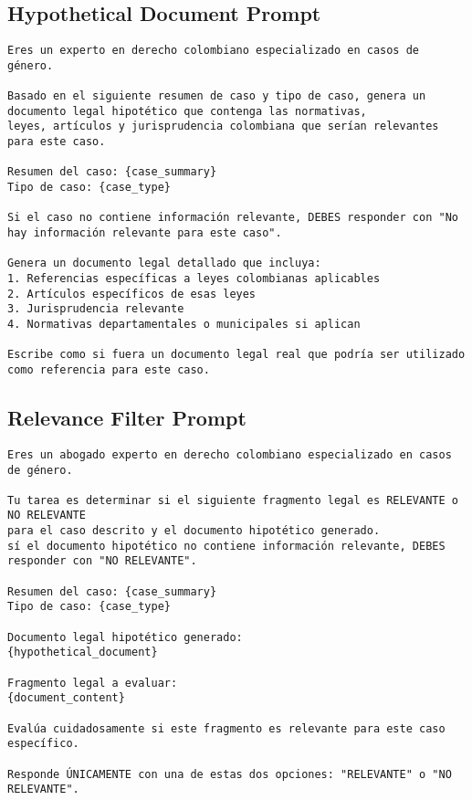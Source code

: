 \subsection{Hypothetical Document Prompt}
\label{subsec:hyde-prompt}
\begin{lstlisting}[style=prompt]
Eres un experto en derecho colombiano especializado en casos de género.
                        
Basado en el siguiente resumen de caso y tipo de caso, genera un documento legal hipotético que contenga las normativas, 
leyes, artículos y jurisprudencia colombiana que serían relevantes para este caso.
                        
Resumen del caso: {case_summary}
Tipo de caso: {case_type}

Si el caso no contiene información relevante, DEBES responder con "No hay información relevante para este caso".   

Genera un documento legal detallado que incluya:
1. Referencias específicas a leyes colombianas aplicables
2. Artículos específicos de esas leyes
3. Jurisprudencia relevante
4. Normativas departamentales o municipales si aplican
                        
Escribe como si fuera un documento legal real que podría ser utilizado como referencia para este caso.
\end{lstlisting}

\subsection{Relevance Filter Prompt}
\label{subsec:relevance-filter-prompt}
\begin{lstlisting}[style=prompt]
Eres un abogado experto en derecho colombiano especializado en casos de género.
                        
Tu tarea es determinar si el siguiente fragmento legal es RELEVANTE o NO RELEVANTE 
para el caso descrito y el documento hipotético generado.
sí el documento hipotético no contiene información relevante, DEBES responder con "NO RELEVANTE".
                        
Resumen del caso: {case_summary}
Tipo de caso: {case_type}
                        
Documento legal hipotético generado:
{hypothetical_document}
                        
Fragmento legal a evaluar:
{document_content}
                        
Evalúa cuidadosamente si este fragmento es relevante para este caso específico.
                        
Responde ÚNICAMENTE con una de estas dos opciones: "RELEVANTE" o "NO RELEVANTE".
\end{lstlisting}


